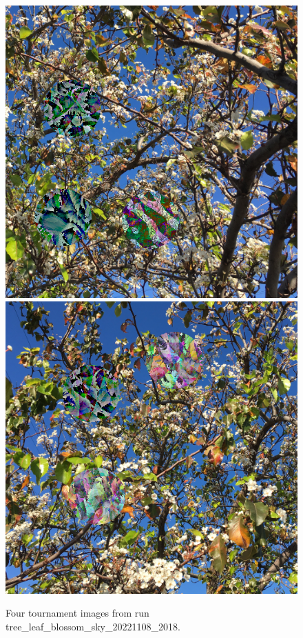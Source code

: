 \documentclass[acmtog]{acmart}
\begin{document}
\begin{figure}
    \hfill
    \includegraphics[scale=0.24]{20221108_2018_step_5947.png}
    \hfill
    \includegraphics[scale=0.24]{20221108_2018_step_6562.png}
    \caption{Four tournament images from run tree\_leaf\_blossom\_sky\_20221108\_2018.}
    \label{fig:tree_leaf_blossom_sky_4x}
\end{figure}
\end{document}
